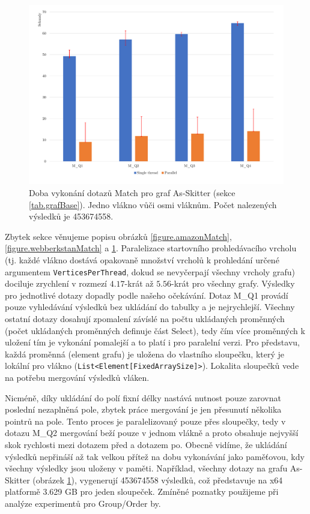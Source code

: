 \begin{figure}[!htp]
\includegraphics[width=\linewidth]{../img/skitterMatch.pdf}\centering
\caption{Doba vykonání dotazů Match pro graf As-Skitter (sekce \ref{tab.grafBase}). Jedno vlákno vůči osmi vláknům. Počet nalezených výsledků je 453674558.}
\label{figure.skitterMatch}
\end{figure}

\clearpage

Zbytek sekce věnujeme popisu obrázků \ref{figure.amazonMatch}, \ref{figure.webberkstanMatch} a \ref{figure.skitterMatch}. Paralelizace startovního prohledávacího vrcholu (tj. každé vlákno dostává opakovaně množství vrcholů k prohledání určené argumentem \verb+VerticesPerThread+, dokud se nevyčerpají všechny vrcholy grafu) dociluje zrychlení v rozmezí $4.17$-krát až $5.56$-krát pro všechny grafy.
Výsledky pro jednotlivé dotazy dopadly podle našeho očekávání. Dotaz M\_Q1 provádí pouze vyhledávání výsledků bez ukládání do tabulky a je nejrychlejší. 
Všechny ostatní dotazy dosahují zpomalení závíslé na počtu ukládaných proměnných (počet ukládaných proměnných definuje část Select), tedy čím více proměnných k uložení tím je vykonání pomalejší a to platí i pro paralelní verzi. 
Pro představu, každá proměnná (element grafu) je uložena do vlastního sloupečku, který je lokální pro vlákno (\verb+List<Element[FixedArraySize]>+). Lokalita sloupečků vede na potřebu mergování výsledků vláken. 

Nicméně, díky ukládání do polí fixní délky nastává nutnost pouze zarovnat poslední nezaplněná pole, zbytek práce mergování je jen přesunutí několika pointrů na pole. 
Tento proces je paralelizovaný pouze přes sloupečky, tedy v dotazu M\_Q2 mergování beží pouze v jednom vlákně a proto obsahuje nejvyšší skok rychlosti mezi dotazem před a dotazem po. 
Obecně vidíme, že ukládání výsledků nepřináší až tak velkou přítež na dobu vykonávání jako paměťovou, kdy všechny výsledky jsou uloženy v paměti. 
Například, všechny dotazy na grafu As-Skitter (obrázek \ref{figure.skitterMatch}), vygenerují 453674558 výsledků, což představuje na x64 platformě 3.629 GB pro jeden sloupeček.
Zmíněné poznatky použijeme při analýze experimentů pro Group/Order by.

